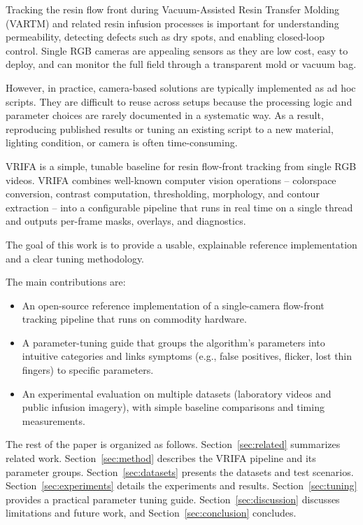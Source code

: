 \documentclass[twocolumn, 10pt]{article}
\begin{document}
Tracking the resin flow front during Vacuum-Assisted Resin Transfer Molding (VARTM) and related resin infusion processes is important for understanding permeability, detecting defects such as dry spots, and enabling closed-loop control. 
Single RGB cameras are appealing sensors as they are low cost, easy to deploy, and can monitor the full field through a transparent mold or vacuum bag.

However, in practice, camera-based solutions are typically implemented as ad hoc scripts. 
They are difficult to reuse across setups because the processing logic and parameter choices are rarely documented in a systematic way. 
As a result, reproducing published results or tuning an existing script to a new material, lighting condition, or camera is often time-consuming.

VRIFA is a simple, tunable baseline for resin flow-front tracking from single RGB videos. VRIFA combines well-known computer vision operations -- colorspace conversion, contrast computation, thresholding, morphology, and contour extraction -- into a configurable pipeline that runs in real time on a single thread and outputs per-frame masks, overlays, and diagnostics.

The goal of this work is to provide a usable, explainable reference implementation and a clear tuning methodology.

The main contributions are:
\begin{itemize}
    \item An open-source reference implementation of a single-camera flow-front tracking pipeline that runs on commodity hardware.
    \item A parameter-tuning guide that groups the algorithm's parameters into intuitive categories and links symptoms (e.g., false positives, flicker, lost thin fingers) to specific parameters.
    \item An experimental evaluation on multiple datasets (laboratory videos and public infusion imagery), with simple baseline comparisons and timing measurements.
\end{itemize}

The rest of the paper is organized as follows. Section~\ref{sec:related} summarizes related work. Section~\ref{sec:method} describes the VRIFA pipeline and its parameter groups. Section~\ref{sec:datasets} presents the datasets and test scenarios. Section~\ref{sec:experiments} details the experiments and results. Section~\ref{sec:tuning} provides a practical parameter tuning guide. Section~\ref{sec:discussion} discusses limitations and future work, and Section~\ref{sec:conclusion} concludes.
\end{document}
